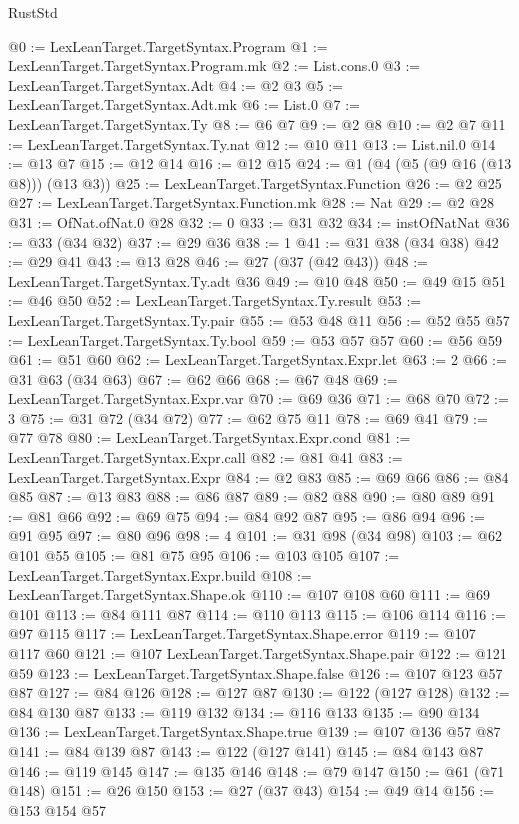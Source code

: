 \begin{lexlean}{RustStd}
\begin{coremodule}
{\begin{coremodule}
{{{{{{{{{@0 := LexLeanTarget.TargetSyntax.Program
@1 := LexLeanTarget.TargetSyntax.Program.mk
@2 := List.cons.{0}
@3 := LexLeanTarget.TargetSyntax.Adt
@4 := @2 @3
@5 := LexLeanTarget.TargetSyntax.Adt.mk
@6 := List.{0}
@7 := LexLeanTarget.TargetSyntax.Ty
@8 := @6 @7
@9 := @2 @8
@10 := @2 @7
@11 := LexLeanTarget.TargetSyntax.Ty.nat
@12 := @10 @11
@13 := List.nil.{0}
@14 := @13 @7
@15 := @12 @14
@16 := @12 @15
@24 := @1 (@4 (@5 (@9 @16 (@13 @8))) (@13 @3))
@25 := LexLeanTarget.TargetSyntax.Function
@26 := @2 @25
@27 := LexLeanTarget.TargetSyntax.Function.mk
@28 := Nat
@29 := @2 @28
@31 := OfNat.ofNat.{0} @28
@32 := 0
@33 := @31 @32
@34 := instOfNatNat
@36 := @33 (@34 @32)
@37 := @29 @36
@38 := 1
@41 := @31 @38 (@34 @38)
@42 := @29 @41
@43 := @13 @28
@46 := @27 (@37 (@42 @43))
@48 := LexLeanTarget.TargetSyntax.Ty.adt @36
@49 := @10 @48
@50 := @49 @15
@51 := @46 @50
@52 := LexLeanTarget.TargetSyntax.Ty.result
@53 := LexLeanTarget.TargetSyntax.Ty.pair
@55 := @53 @48 @11
@56 := @52 @55
@57 := LexLeanTarget.TargetSyntax.Ty.bool
@59 := @53 @57 @57
@60 := @56 @59
@61 := @51 @60
@62 := LexLeanTarget.TargetSyntax.Expr.let
@63 := 2
@66 := @31 @63 (@34 @63)
@67 := @62 @66
@68 := @67 @48
@69 := LexLeanTarget.TargetSyntax.Expr.var
@70 := @69 @36
@71 := @68 @70
@72 := 3
@75 := @31 @72 (@34 @72)
@77 := @62 @75 @11
@78 := @69 @41
@79 := @77 @78
@80 := LexLeanTarget.TargetSyntax.Expr.cond
@81 := LexLeanTarget.TargetSyntax.Expr.call
@82 := @81 @41
@83 := LexLeanTarget.TargetSyntax.Expr
@84 := @2 @83
@85 := @69 @66
@86 := @84 @85
@87 := @13 @83
@88 := @86 @87
@89 := @82 @88
@90 := @80 @89
@91 := @81 @66
@92 := @69 @75
@94 := @84 @92 @87
@95 := @86 @94
@96 := @91 @95
@97 := @80 @96
@98 := 4
@101 := @31 @98 (@34 @98)
@103 := @62 @101 @55
@105 := @81 @75 @95
@106 := @103 @105
@107 := LexLeanTarget.TargetSyntax.Expr.build
@108 := LexLeanTarget.TargetSyntax.Shape.ok
@110 := @107 @108 @60
@111 := @69 @101
@113 := @84 @111 @87
@114 := @110 @113
@115 := @106 @114
@116 := @97 @115
@117 := LexLeanTarget.TargetSyntax.Shape.error
@119 := @107 @117 @60
@121 := @107 LexLeanTarget.TargetSyntax.Shape.pair
@122 := @121 @59
@123 := LexLeanTarget.TargetSyntax.Shape.false
@126 := @107 @123 @57 @87
@127 := @84 @126
@128 := @127 @87
@130 := @122 (@127 @128)
@132 := @84 @130 @87
@133 := @119 @132
@134 := @116 @133
@135 := @90 @134
@136 := LexLeanTarget.TargetSyntax.Shape.true
@139 := @107 @136 @57 @87
@141 := @84 @139 @87
@143 := @122 (@127 @141)
@145 := @84 @143 @87
@146 := @119 @145
@147 := @135 @146
@148 := @79 @147
@150 := @61 (@71 @148)
@151 := @26 @150
@153 := @27 (@37 @43)
@154 := @49 @14
@156 := @153 @154 @57
}}}}}}}}}
\end{coremodule}}
\end{coremodule}
\end{lexlean}
